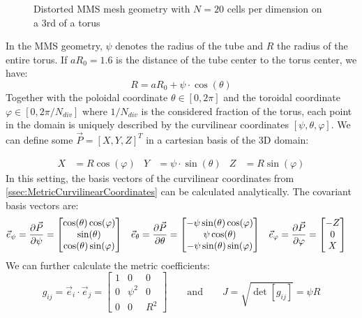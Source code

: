\begin{figure}[H]
\begin{subfigure}[b]{0.4\textwidth}
		\label{fig:MMSModelTorturedCrossSection}
	\end{subfigure}	
	\caption{Distorted MMS mesh geometry with $N=20$ cells per dimension on a 3rd of a torus}
	\label{fig:MMSModelScheme}
\end{figure}

In the MMS geometry, $\psi$ denotes the radius of the tube and $R$ the radius of the entire torus. If $aR_0=1.6$ is the distance of the tube center to the torus center, we have:
$$  R = aR_0 + \psi\cdot\cos(\theta) $$
Together with the poloidal coordinate $\theta\in[0,2\pi]$ and the toroidal coordinate $\varphi\in[0,2\pi/N_{div}]$ where $1/N_{div}$ is the considered fraction of the torus, each point in the domain is uniquely described by the curvilinear coordinates $[\psi,\theta,\varphi]$. 
We can define some $\vec{P} = [X,Y,Z]^T$ in a cartesian basis of the 3D domain:

\begin{align*}
	X &= R\cos(\varphi) &  Y &= \psi\cdot\sin(\theta)  &  Z &= R\sin(\varphi)
\end{align*} 
In this setting, the basis vectors of the curvilinear coordinates from \autoref{ssec:MetricCurvilinearCoordinates} can be calculated analytically. The covariant basis vectors are:
\begin{align*}
	\vec{e}_\psi &= \pdv{\vec{P}}{\psi} = \begin{bmatrix} \cos(\theta)\cos(\varphi) \\ \sin(\theta) \\ \cos(\theta)\sin(\varphi) \end{bmatrix} & \vec{e}_\theta &= \pdv{\vec{P}}{\theta} = \begin{bmatrix} -\psi\sin(\theta)\cos(\varphi) \\ \psi\cos(\theta) \\ -\psi\sin(\theta)\sin(\varphi) \end{bmatrix} & \vec{e}_\varphi &= \pdv{\vec{P}}{\varphi} = \begin{bmatrix} -Z \\ 0 \\ X \end{bmatrix}
\end{align*}
We can further calculate the metric coefficients:
$$ g_{ij} = \vec{e}_i\cdot\vec{e}_j
= \begin{bmatrix}
	1 & 0 & 0 \\ 0 & \psi^2 & 0 \\ 0 & 0 & R^2
\end{bmatrix} \qquad \text{and} \qquad J = \sqrt{\det[g_{ij}]} = \psi R$$
 
